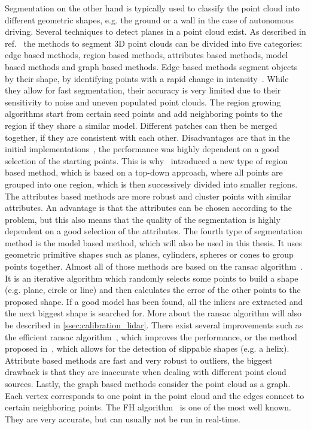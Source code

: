 Segmentation on the other hand is typically used to classify the point cloud into different geometric shapes, e.g. the ground or a wall in the case of autonomous driving.
Several techniques to detect planes in a point cloud exist.
As described in ref.~\cite{Nguyen2013} the methods to segment 3D point clouds can be divided into five categories: edge based methods, region based methods, attributes based methods, model based methods and graph based methods.
Edge based methods segment objects by their shape, by identifying points with a rapid change in intensity~\cite{Sappa2001}. While they allow for fast segmentation, their accuracy is very limited due to their sensitivity to noise and uneven populated point clouds.
The region growing algorithms start from certain seed points and add neighboring points to the region if they share a similar model.
Different patches can then be merged together, if they are consistent with each other.
Disadvantages are that in the initial implementations~\cite{Besl1988, Taubin1991}, the performance was highly dependent on a good selection of the starting points.
This is why~\cite{Chen2008} introduced a new type of region based method, which is based on a top-down approach, where all points are grouped into one region, which is then successively divided into smaller regions.
The attributes based methods are more robust and cluster points with similar attributes.
An advantage is that the attributes can be chosen according to the problem, but this also means that the quality of the segmentation is highly dependent on a good selection of the attributes.
The fourth type of segmentation method is the model based method, which will also be used in this thesis.
It uses geometric primitive shapes such as planes, cylinders, spheres or cones to group points together.
Almost all of those methods are based on the \gls{ransac} algorithm~\cite{Fischler1981}.
It is an iterative algorithm which randomly selects some points to build a shape (e.g. plane, circle or line) and then calculates the error of the other points to the proposed shape.
If a good model has been found, all the inliers are extracted and the next biggest shape is searched for.
More about the \gls{ransac} algorithm will also be described in \cref{ssec:calibration_lidar}.
There exist several improvements such as the efficient \gls{ransac} algorithm~\cite{Schnabel2007}, which improves the performance, or the method proposed in~\cite{li2011}, which allows for the detection of slippable shapes (e.g. a helix).
Attribute based methods are fast and very robust to outliers, the biggest drawback is that they are inaccurate when dealing with different point cloud sources.
Lastly, the graph based methods consider the point cloud as a graph.
Each vertex corresponds to one point in the point cloud and the edges connect to certain neighboring points.
The FH algorithm~\cite{Felzenszwalb2004} is one of the most well known.
They are very accurate, but can usually not be run in real-time.


